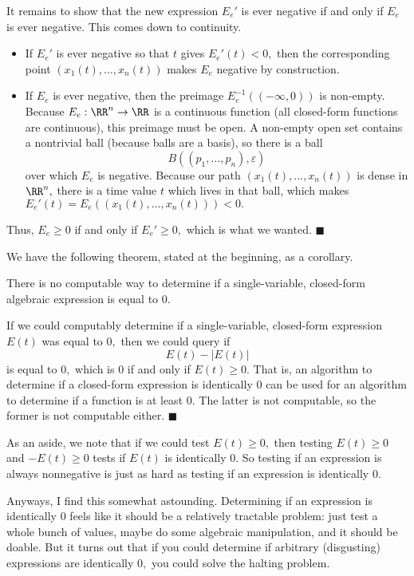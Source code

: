 It remains to show that the new expression $E_e'$ is ever negative if and only if $E_e$ is ever negative. This comes down to continuity.
\begin{itemize}
    \item If $E_e'$ is ever negative so that $t$ gives $E_e'(t)<0,$ then the corresponding point $(x_1(t),\ldots,x_n(t))$ makes $E_e$ negative by construction.
    \item If $E_e$ is ever negative, then the preimage $E_e^{-1}((-\infty,0))$ is non-empty. Because $E_e:\RR^n\to\RR$ is a continuous function (all closed-form functions are continuous), this preimage must be open. A non-empty open set contains a nontrivial ball (because balls are a basis), so there is a ball
    \[B((p_1,\ldots,p_n),\varepsilon)\]
    over which $E_e$ is negative. Because our path $(x_1(t),\ldots,x_n(t))$ is dense in $\RR^n,$ there is a time value $t$ which lives in that ball, which makes $E_e'(t)=E_e((x_1(t),\ldots,x_n(t)))<0.$
\end{itemize}
Thus, $E_e\ge0$ if and only if $E_e'\ge0,$ which is what we wanted. $\blacksquare$

We have the following theorem, stated at the beginning, as a corollary.
\begin{theorem}
    There is no computable way to determine if a single-variable, closed-form algebraic expression is equal to $0.$
\end{theorem}
If we could computably determine if a single-variable, closed-form expression $E(t)$ was equal to $0,$ then we could query if
\[E(t)-|E(t)|\]
is equal to $0,$ which is $0$ if and only if $E(t)\ge0.$ That is, an algorithm to determine if a closed-form expression is identically $0$ can be used for an algorithm to determine if a function is at least $0.$ The latter is not computable, so the former is not computable either. $\blacksquare$

As an aside, we note that if we could test $E(t)\ge0,$ then testing $E(t)\ge0$ and $-E(t)\ge0$ tests if $E(t)$ is identically $0.$ So testing if an expression is always nonnegative is just as hard as testing if an expression is identically $0.$

Anyways, I find this somewhat astounding. Determining if an expression is identically $0$ feels like it should be a relatively tractable problem: just test a whole bunch of values, maybe do some algebraic manipulation, and it should be doable. But it turns out that if you could determine if arbitrary (disgusting) expressions are identically $0,$ you could solve the halting problem.

